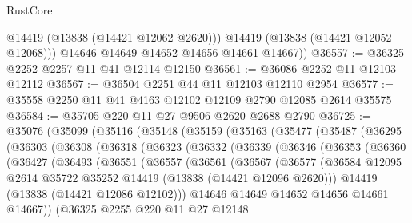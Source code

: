 \begin{lexlean}{RustCore}
\begin{coremodule}
            @14419
            (@13838 (@14421 @12062 @2620)))
          @14419
          (@13838 (@14421 @12052 @12068)))
        @14646
        @14649
        @14652
        @14656
        @14661
        @14667))
@36557 := @36325 @2252 @2257 @11 @41 @12114 @12150
@36561 := @36086 @2252 @11 @12103 @12112
@36567 := @36504 @2251 @44 @11 @12103 @12110 @2954
@36577 := @35558 @2250 @11 @41 @4163 @12102 @12109 @2790 @12085 @2614 @35575
@36584 := @35705 @220 @11 @27 @9506 @2620 @2688 @2790
@36725 := @35076
    (@35099
      (@35116
        (@35148
          (@35159
            (@35163
              (@35477
                (@35487
                  (@36295
                    (@36303
                      (@36308
                        (@36318
                          (@36323
                            (@36332
                              (@36339
                                (@36346
                                  (@36353
                                    (@36360
                                      (@36427
                                        (@36493
                                          (@36551
                                            (@36557
                                              (@36561
                                                (@36567
                                                  (@36577
                                                    (@36584
                                                      @12095
                                                      @2614
                                                      @35722
                                                      @35252
                                                      @14419
                                                      (@13838 (@14421 @12096 @2620)))
                                                    @14419
                                                    (@13838 (@14421 @12086 @12102)))
                                                  @14646
                                                  @14649
                                                  @14652
                                                  @14656
                                                  @14661
                                                  @14667))
                                              (@36325
                                                @2255
                                                @220
                                                @11
                                                @27
                                                @12148

\end{coremodule}
\end{lexlean}
